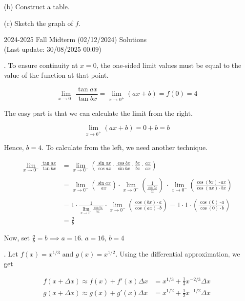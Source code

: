 \documentclass{article}
\begin{document}
\hfill

(b) Construct a table.

\hfill

(c) Sketch the graph of $f$.

\newpage

\begin{center}
2024-2025 Fall Midterm (02/12/2024) Solutions\\
(Last update: 30/08/2025 00:09)
\end{center}

. To ensure continuity at $x=0$, the one-sided limit values must be equal to the value of the function at that point.

\[
\lim_{x\to0^-} \frac{\tan ax}{\tan bx} = \lim_{x\to0^+} (ax+b) = f(0) = 4
\]

\hfill

\noindent The easy part is that we can calculate the limit from the right.

\[
\lim_{x\to0^+} (ax+b) = 0+b = b
\]

\hfill

\noindent Hence, $b=4$. To calculate from the left, we need another technique.

\begin{align*}
\lim_{x\to0^-} \frac{\tan ax}{\tan bx} &= \lim_{x\to0^-} \left(\frac{\sin ax}{\cos ax} \cdot \frac{\cos bx}{\sin bx} \cdot \frac{bx}{bx}\cdot \frac{ax}{ax}\right)\\\\&=\lim_{x\to0^-} \left(\frac{\sin ax}{ax} \right)\cdot \lim_{x\to0^-} \left(\frac1{ \frac{\sin bx}{bx}}\right)\ \cdot \lim_{x\to0^-} \left(\frac{\cos (bx) \cdot ax}{\cos(ax) \cdot bx}\right)\\\\&=1\cdot  \frac1{\displaystyle \lim_{x\to0^-} \frac{\sin bx}{bx} }\cdot \lim_{x\to0^-} \left(\frac{\cos (bx) \cdot a}{\cos(ax) \cdot b}\right)= 1\cdot 1\cdot\left(\frac{\cos(0) \cdot a}{\cos(0) \cdot b}\right)\\&=\frac ab
\end{align*}

\hfill

\noindent Now, set $\displaystyle \frac ab = b\implies a= 16$. $\boxed{a=16,\,b=4}$

\hfill

. Let $f(x) = x^{1/3}$ and $g(x) = x^{1/2}$. Using the differential approximation, we get

\begin{align*}
f(x+\Delta x)\approx f(x) + f'(x)\Delta x&=x^{1/3}+\frac13x^{-2/3}\Delta x\\
g(x+\Delta x)\approx g(x) + g'(x)\Delta x&=x^{1/2}+\frac12x^{-1/2}\Delta x
\end{align*}
\end{document}
